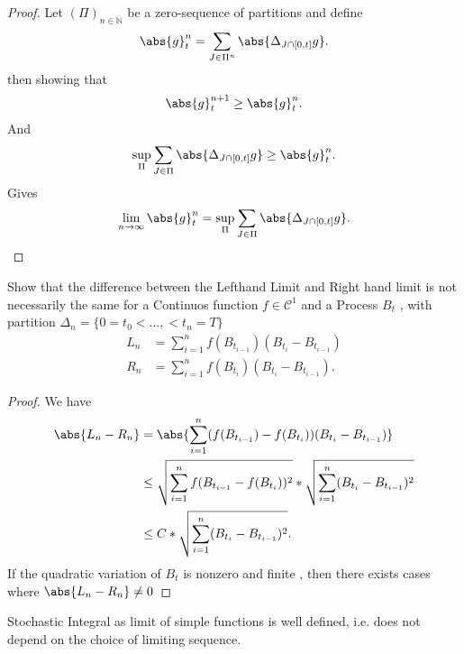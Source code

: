 \begin{proof}
  Let $(\Pi )_{n \in  \mathbb{N}}$ be a zero-sequence of partitions and define
 \begin{align*}
   \abs{g}_t^n =  \sum_{J \in  \Pi^n}\abs{\Delta_{J \cap [0,t]} g} 
 .\end{align*}
 then showing that 
 \begin{align*}
   \abs{g}_t^{n+1} \ge    \abs{g}_t^{n}
 .\end{align*}
And 
\begin{align*}
  \sup_{\Pi } \sum_{J \in  \Pi }\abs{\Delta_{J \cap [0,t]} g} \ge  \abs{g}_t^{n}
.\end{align*}
Gives
\begin{align*}
  \lim_{n \to \infty} \abs{g}_t^{n} = \sup_{\Pi } \sum_{J \in  \Pi }\abs{\Delta_{J \cap [0,t]} g}
.\end{align*}
\end{proof}
\newpage
\begin{exercise}
 Show that the difference between the Lefthand Limit and Right hand limit is not necessarily the same for a Continuos function
 $f \in  \mathcal{C}^{1} $ and a Process $B_t$ , with partition $\Delta_n = \{0=t_0<\ldots , < t_n = T\}  $
 \begin{align*}
   L_n &= \sum_{i=1}^{n} f(B_{t_{i-1}})(B_{t_i}-B_{t_{i-1}})\\
   R_n &= \sum_{i=1}^{n} f(B_{t_i})(B_{t_i}-B_{t_{i-1}})
 .\end{align*}
\end{exercise}
\begin{proof}
 We have 
 \begin{align*}
   \abs{L_n - R_n} &= \abs{\sum_{i=1}^{n} (f(B_{t_{i-1}})-f(B_{t_i}))(B_{t_i}-B_{t_{i-1}})} \\ 
                   &\le   \sqrt{ \sum_{i=1}^{n} f(B_{t_{i-1}}-f(B_{t_i}))^2}*\sqrt{\sum_{i=1}^{n} (B_{t_i}-B_{t_{i-1}})^2} \\
                   &\le   C * \sqrt{\sum_{i=1}^{n} (B_{t_i}-B_{t_{i-1}})^2}
 .\end{align*}
 If the quadratic variation of $B_t$ is nonzero and finite , then there exists cases where $\abs{L_n - R_n} \neq 0$
\end{proof}
\begin{exercise}
 Stochastic Integral as limit of simple functions is well defined, i.e. does not depend on the choice of limiting sequence. 
\end{exercise}
